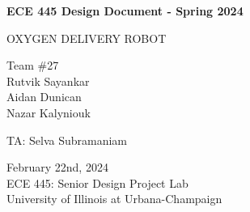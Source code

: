 \documentclass[journal,onecolumn, draftclsnofoot, 12pt]{IEEEtran}
\begin{document}
\maketitle

\begin{titlepage}
    \begin{center}
        \vspace*{1cm}
            
        \Huge
        \textbf{ECE 445 Design Document - Spring 2024}
            
        \vspace{0.5cm}
        \LARGE
        OXYGEN DELIVERY ROBOT
            
        \vspace{1.5cm}

        \large
        Team \#27 \\
        Rutvik Sayankar \\ Aidan Dunican \\ Nazar Kalyniouk \\

        \vspace{1cm}
        
        TA: Selva Subramaniam

        \vspace{1.5cm}
            
        \vfill

        \vspace{0.8cm}
            
        \Large
        February 22nd, 2024 \\
        ECE 445: Senior Design Project Lab \\
        University of Illinois at Urbana-Champaign\\
            
    \end{center}
\end{titlepage}

\pagebreak

\tableofcontents

\pagebreak
\end{document}
